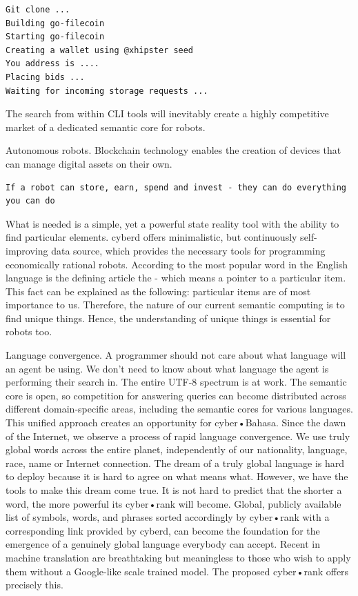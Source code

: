 \documentclass[8pt,oneside]{amsart}
\newcommand{\linkgreen}[2]{\href{#1}{\color{green}{#2}}}
\newcommand{\code}[1]{{\PlayBold #1}}
\begin{document}
\begin{Abstract}
\begin{lstlisting}
Git clone ...
Building go-filecoin
Starting go-filecoin
Creating a wallet using @xhipster seed
You address is ....
Placing bids ...
Waiting for incoming storage requests ...

\end{lstlisting}

The search from within CLI tools will inevitably create a highly competitive market of a dedicated semantic core for robots.

\code{Autonomous robots}. Blockchain technology enables the creation of devices that can manage digital assets on their own.

\begin{lstlisting}
If a robot can store, earn, spend and invest - they can do everything you can do
\end{lstlisting}

What is needed is a simple, yet a powerful state reality tool with the ability to find particular elements. \code{cyberd} offers minimalistic, but continuously self-improving data source, which provides the necessary tools for programming economically rational robots. According to \linkgreen{https://github.com/first20hours/google-10000-english}{top-10,000 English words} the most popular word in the English language is the defining article \code{the} - which means a pointer to a particular item. This fact can be explained as the following: particular items are of most importance to us. Therefore, the nature of our current semantic computing is to find unique things. Hence, the understanding of unique things is essential for robots too.

\code{Language convergence}. A programmer should not care about what language will an agent be using. We don't need to know about what language the agent is performing their search in. The entire UTF-8 spectrum is at work. The semantic core is open, so competition for answering queries can become distributed across different domain-specific areas, including the semantic cores for various languages. This unified approach creates an opportunity for cyber•Bahasa. Since the dawn of the Internet, we observe a process of rapid language convergence. We use truly global words across the entire planet, independently of our nationality, language, race, name or Internet connection. The dream of a truly global language is hard to deploy because it is hard to agree on what means what. However, we have the tools to make this dream come true. It is not hard to predict that the shorter a word, the more powerful its cyber•rank will become. Global, publicly available list of symbols, words, and phrases sorted accordingly by cyber•rank with a corresponding link provided by cyberd, can become the foundation for the emergence of a genuinely global language everybody can accept. Recent \linkgreen{https://ipfs.io/ipfs/QmQUWBhDMfPKgFt3NfbxM1VU22oU8CRepUzGPBDtopwap1}{scientific advances} in machine translation are breathtaking but meaningless to those who wish to apply them without a Google-like scale trained model. The proposed cyber•rank offers precisely this.


\end{Abstract}
\end{document}
